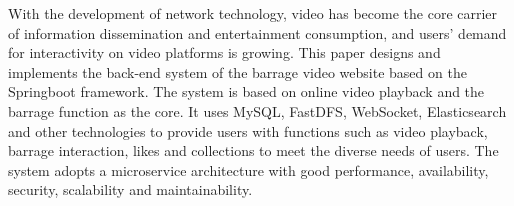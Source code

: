 {}

\begin{abstracten}
    With the development of network technology, video has become the core carrier of information dissemination and entertainment consumption, and users' demand for interactivity on video platforms is growing. This paper designs and implements the back-end system of the barrage video website based on the Springboot framework. The system is based on online video playback and the barrage function as the core. It uses MySQL, FastDFS, WebSocket, Elasticsearch and other technologies to provide users with functions such as video playback, barrage interaction, likes and collections to meet the diverse needs of users. The system adopts a microservice architecture with good performance, availability, security, scalability and maintainability.
\end{abstracten}